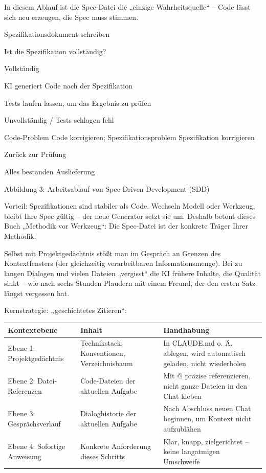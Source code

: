 In diesem Ablauf ist die Spec-Datei die „einzige Wahrheitsquelle“ – Code lässt sich neu erzeugen, die Spec muss stimmen.

Spezifikationsdokument schreiben

Ist die Spezifikation vollständig?

Vollständig

KI generiert Code nach der Spezifikation

Tests laufen lassen, um das Ergebnis zu prüfen

Unvollständig / Tests schlagen fehl

Code-Problem Code korrigieren; Spezifikationsproblem Spezifikation korrigieren

Zurück zur Prüfung

Alles bestanden Auslieferung

\begin{center}\small\color{gray}Abbildung 3: Arbeitsablauf von Spec-Driven Development (SDD)\end{center}

Vorteil: Spezifikationen sind stabiler als Code. Wechseln Modell oder Werkzeug, bleibt Ihre Spec gültig – der neue Generator setzt sie um. Deshalb betont dieses Buch „Methodik vor Werkzeug“: Die Spec-Datei ist der konkrete Träger Ihrer Methodik.


Selbst mit Projektgedächtnis stößt man im Gespräch an Grenzen des Kontextfensters (der gleichzeitig verarbeitbaren Informationsmenge). Bei zu langen Dialogen und vielen Dateien „vergisst“ die KI frühere Inhalte, die Qualität sinkt – wie nach sechs Stunden Plaudern mit einem Freund, der den ersten Satz längst vergessen hat.

Kernstrategie: „geschichtetes Zitieren“:

\begin{center}
\begin{tabularx}{\linewidth}{|X|X|X|}
\hline
\textbf{Kontextebene} & \textbf{Inhalt} & \textbf{Handhabung} \tabularnewline
\hline
Ebene 1: Projektgedächtnis & Technikstack, Konventionen, Verzeichnisbaum & In CLAUDE.md o. Ä. ablegen, wird automatisch geladen, nicht wiederholen \tabularnewline
Ebene 2: Datei-Referenzen & Code-Dateien der aktuellen Aufgabe & Mit @ präzise referenzieren, nicht ganze Dateien in den Chat kleben \tabularnewline
Ebene 3: Gesprächsverlauf & Dialoghistorie der aktuellen Aufgabe & Nach Abschluss neuen Chat beginnen, um Kontext nicht aufzublähen \tabularnewline
Ebene 4: Sofortige Anweisung & Konkrete Anforderung dieses Schritts & Klar, knapp, zielgerichtet – keine langatmigen Umschweife \tabularnewline
\hline
\end{tabularx}
\end{center}

